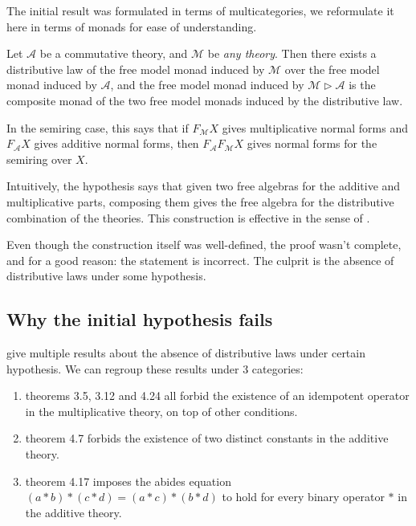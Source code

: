 The initial result was formulated in terms of multicategories, we reformulate it here in terms of monads for ease of understanding.

\begin{hypothesis}
  Let $\mathcal A$ be a commutative theory, and $\mathcal M$ be \emph{any theory}. Then there exists a distributive law of the free model monad induced by $\mathcal M$ over the free model monad induced by $\mathcal A$, and the free model monad induced by $\mathcal M \triangleright \mathcal A$ is the composite monad of the two free model monads induced by the distributive law.
  \label{hyp:fail}
\end{hypothesis}

\noindent In the semiring case, this says that if $F_{\mathcal{M}} X$ gives multiplicative normal forms and $F_{\mathcal{A}} X$ gives additive normal forms, then $F_{\mathcal{A}} F_{\mathcal{M}} X$ gives normal forms for the semiring over $X$.

Intuitively, the hypothesis says that given two free algebras for the additive and multiplicative parts, composing them gives the free algebra for the distributive combination of the theories. This construction is effective in the sense of .

Even though the construction itself was well-defined, the proof wasn't complete, and for a good reason: the statement is incorrect. The culprit is the absence of distributive laws under some hypothesis.

\subsection{Why the initial hypothesis fails}
\label{sec:failure}

\textcite{nogo_distributive_law} give multiple results about the absence of distributive laws under certain hypothesis. We can regroup these results under 3 categories:
\begin{enumerate}
  \item theorems 3.5, 3.12 and 4.24 all forbid the existence of an idempotent operator in the multiplicative theory, on top of other conditions.
  \item theorem 4.7 forbids the existence of two distinct constants in the additive theory.
  \item theorem 4.17 imposes the abides equation $(a \ast b) \ast (c \ast d) = (a \ast c) \ast (b \ast d)$ to hold for every binary operator $\ast$ in the additive theory.
\end{enumerate}

